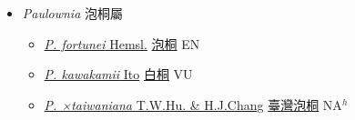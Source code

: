 
  \begin{itemize}
 \item[] \textit{Paulownia} 泡桐屬
                    
  \begin{itemize}
        \item[] \href{http://www.theplantlist.org/tpl1.1/search?q=Paulownia+fortunei}{\textit{P. fortunei} Hemsl.}   \href{\detokenize{http://taibnet.sinica.edu.tw/chi/taibnet_species_list.php?T2=泡桐&T2_new_value=true&fr=y}}{泡桐} EN
        \item[] \href{http://www.theplantlist.org/tpl1.1/search?q=Paulownia+kawakamii}{\textit{P. kawakamii} Ito}   \href{\detokenize{http://taibnet.sinica.edu.tw/chi/taibnet_species_list.php?T2=白桐&T2_new_value=true&fr=y}}{白桐} VU
        \item[] \href{http://www.theplantlist.org/tpl1.1/search?q=Paulownia+×taiwaniana}{\textit{P. ×taiwaniana} T.W.Hu. \& H.J.Chang}   \href{\detokenize{http://taibnet.sinica.edu.tw/chi/taibnet_species_list.php?T2=臺灣泡桐&T2_new_value=true&fr=y}}{臺灣泡桐} NA$^h$
  \end{itemize}
  \end{itemize}
